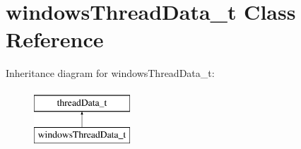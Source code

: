 \hypertarget{classwindowsThreadData__t}{\section{windows\-Thread\-Data\-\_\-t \-Class \-Reference}
\label{classwindowsThreadData__t}
}
\-Inheritance diagram for windows\-Thread\-Data\-\_\-t\-:\begin{figure}[H]
\begin{center}
\leavevmode
\includegraphics[height=2.000000cm]{classwindowsThreadData__t}
\end{center}
\end{figure}
